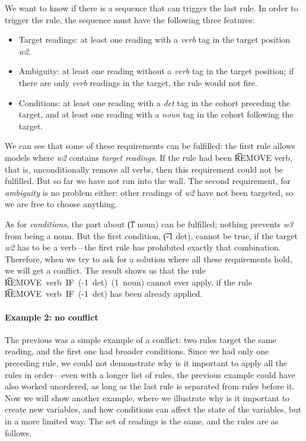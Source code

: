 We want to know if there is a sequence that can trigger the last rule.
In order to trigger the rule, the sequence must have the following three features:
\begin{itemize}
\item Target readings: at least one reading with a \emph{verb} tag in the target position {\em w2}.
\item Ambiguity: at least one reading without a \emph{verb} tag in the target position; if there are only \emph{verb} readings in the target, the rule would not fire.
\item Conditions: at least one reading with a \emph{det} tag in the cohort preceding the target, and at least one reading with a \emph{noun} tag in the cohort following the target.
\end{itemize}


We can see that some of these requirements can be fulfilled: the first rule allows models where {\em w2} contains \emph{target readings}. If the rule had been \t{REMOVE verb}, that is, unconditionally remove all verbs, then this requirement could not be fulfilled. But so far we have not run into the wall. 
The second requirement, for \emph{ambiguity} is no problem either: other readings of {\em w2} have not been targeted, so we are free to choose anything.

As for \emph{conditions}, the part about \t{(1 noun)} can be fulfilled; nothing prevents {\em w3} from being a noun. But the first condition, \t{(-1 det)}, cannot be true, if the target {\em w2} has to be a verb---the first rule has prohibited exactly that combination.
Therefore, when we try to ask for a solution where all these requirements hold, we will get a conflict. The result shows us that the rule \t{REMOVE~verb~IF~(-1~det)~(1~noun)} cannot ever apply, if the rule \t{REMOVE~verb~IF~(-1~det)} has been already applied. 

\paragraph{Example 2: no conflict}
The previous was a simple example of a conflict: two rules target the same reading, and the first one had broader conditions. 
Since we had only one preceding rule, we could not demonstrate why is it important to apply all the rules in order---even with a longer list of rules, the previous example could have also worked unordered, as long as the last rule is separated from rules before it.
Now we will show another example, where we illustrate why is it important to create new variables, and how conditions can affect the state of the variables, but in a more limited way. The set of readings is the same, and the rules are as follows.

